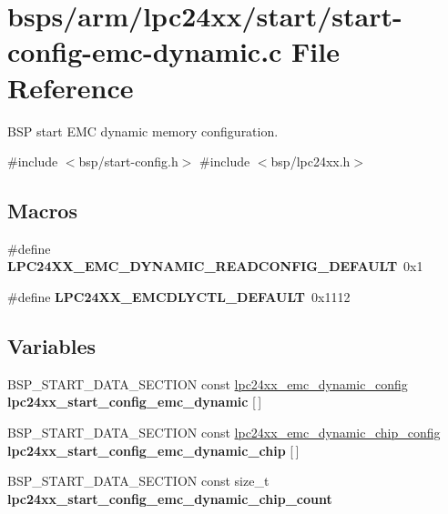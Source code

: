 \hypertarget{start-config-emc-dynamic_8c}{}\section{bsps/arm/lpc24xx/start/start-\/config-\/emc-\/dynamic.c File Reference}
\label{start-config-emc-dynamic_8c}


B\+SP start E\+MC dynamic memory configuration.  


{\ttfamily \#include $<$bsp/start-\/config.\+h$>$}\newline
{\ttfamily \#include $<$bsp/lpc24xx.\+h$>$}\newline
\subsection*{Macros}
\begin{DoxyCompactItemize}
\item 
\mbox{\label{start-config-emc-dynamic_8c_a7debdfc87f4ec64ccc955c49f4a48ea5}} 
\#define {\bfseries L\+P\+C24\+X\+X\+\_\+\+E\+M\+C\+\_\+\+D\+Y\+N\+A\+M\+I\+C\+\_\+\+R\+E\+A\+D\+C\+O\+N\+F\+I\+G\+\_\+\+D\+E\+F\+A\+U\+LT}~0x1
\item 
\mbox{\label{start-config-emc-dynamic_8c_a3e07995c13a19d9b040ca916f08d5958}} 
\#define {\bfseries L\+P\+C24\+X\+X\+\_\+\+E\+M\+C\+D\+L\+Y\+C\+T\+L\+\_\+\+D\+E\+F\+A\+U\+LT}~0x1112
\end{DoxyCompactItemize}
\subsection*{Variables}
\begin{DoxyCompactItemize}
\item 
\mbox{\label{start-config-emc-dynamic_8c_a95181910c97e800c3d8d3b2485aad8fb}} 
B\+S\+P\+\_\+\+S\+T\+A\+R\+T\+\_\+\+D\+A\+T\+A\+\_\+\+S\+E\+C\+T\+I\+ON const \mbox{\hyperlink{structlpc24xx__emc__dynamic__config}{lpc24xx\+\_\+emc\+\_\+dynamic\+\_\+config}} {\bfseries lpc24xx\+\_\+start\+\_\+config\+\_\+emc\+\_\+dynamic} \mbox{[}$\,$\mbox{]}
\item 
\mbox{\label{start-config-emc-dynamic_8c_a60954433c1d7b0c615e44aee4bad48ee}} 
B\+S\+P\+\_\+\+S\+T\+A\+R\+T\+\_\+\+D\+A\+T\+A\+\_\+\+S\+E\+C\+T\+I\+ON const \mbox{\hyperlink{structlpc24xx__emc__dynamic__chip__config}{lpc24xx\+\_\+emc\+\_\+dynamic\+\_\+chip\+\_\+config}} {\bfseries lpc24xx\+\_\+start\+\_\+config\+\_\+emc\+\_\+dynamic\+\_\+chip} \mbox{[}$\,$\mbox{]}
\item 
B\+S\+P\+\_\+\+S\+T\+A\+R\+T\+\_\+\+D\+A\+T\+A\+\_\+\+S\+E\+C\+T\+I\+ON const size\+\_\+t {\bfseries lpc24xx\+\_\+start\+\_\+config\+\_\+emc\+\_\+dynamic\+\_\+chip\+\_\+count}
\end{DoxyCompactItemize}



